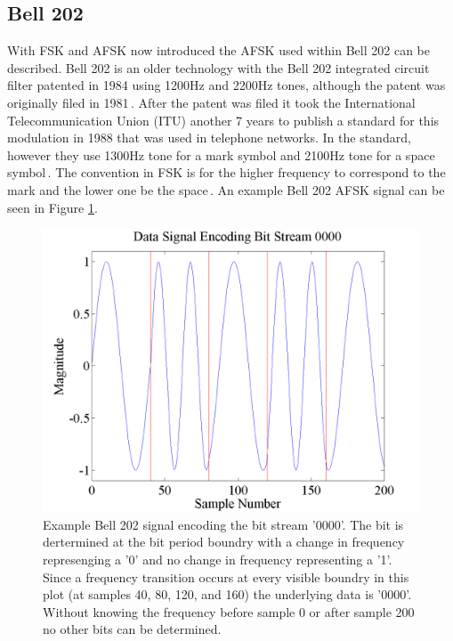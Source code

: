\subsection{Bell 202}
With FSK and AFSK now introduced the AFSK used within Bell 202 can be described. Bell 202 is an older technology with the Bell 202 integrated circuit filter patented in 1984 using 1200Hz and 2200Hz tones, although the patent was originally filed in 1981\,\cite{stauffer1984fsk}. After the patent was filed it took the International Telecommunication Union (ITU) another 7 years to publish a standard for this modulation in 1988 that was used in telephone networks. In the standard, however they use 1300Hz tone for a mark symbol and 2100Hz tone for a space symbol\,\cite{ITUV23}. The convention in FSK is for the higher frequency to correspond to the mark and the lower one be the space\,\cite{Watson1980}. An example Bell 202 AFSK signal can be seen in Figure \ref{exampleBitStream}.
\begin{figure}
  \centering
	\includegraphics[width=0.75\linewidth]{images/Datasignalencodingbitstream0000.png} 
	\caption{Example Bell 202 signal encoding the bit stream '0000'. The bit is dertermined at the bit period boundry with a change in frequency represenging a '0' and no change in frequency representing a '1'. Since a frequency transition occurs at every visible boundry in this plot (at samples 40, 80, 120, and 160) the underlying data is '0000'. Without knowing the frequency before sample 0 or after sample 200 no other bits can be determined.}
	\label{exampleBitStream}
\end{figure}
